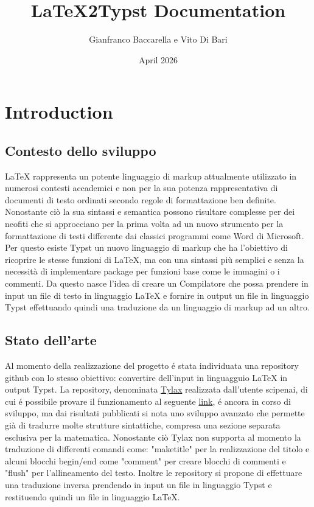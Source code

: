 ﻿\documentclass{article}
\title{LaTeX2Typst Documentation}
\author{Gianfranco Baccarella e Vito Di Bari}
\date{April 2026}
\begin{document}
    \maketitle
    \tableofcontents

    \section{Introduction}

    \subsection{Contesto dello sviluppo}
    LaTeX rappresenta un potente linguaggio di markup attualmente utilizzato in numerosi contesti accademici e non per la sua potenza rappresentativa di documenti di testo ordinati secondo regole di formattazione ben definite. Nonostante ciò la sua sintassi e semantica possono risultare complesse per dei neofiti che si approcciano per la prima volta ad un nuovo strumento per la formattazione di testi differente dai classici programmi come Word di Microsoft. Per questo esiste Typst un nuovo linguaggio di markup che ha l'obiettivo di ricoprire le stesse funzioni di LaTeX, ma con una sintassi più semplici e senza la necessità di implementare package per funzioni base come le immagini o i commenti.
    Da questo nasce l'idea di creare un Compilatore che possa prendere in input un file di testo in linguaggio LaTeX e fornire in output un file in linguaggio Typst effettuando quindi una traduzione da un linguaggio di markup ad un altro.

    \subsection{Stato dell'arte}
    Al momento della realizzazione del progetto é stata individuata una repository github con lo stesso obiettivo: convertire dell'input in linguagguio LaTeX in output Typst. La repository, denominata \href{https://github.com/scipenai/tylax}{Tylax} realizzata dall'utente scipenai, di cui é possibile provare il funzionamento al seguente \href{https://convert.silkyai.cn}{link}, é ancora in corso di sviluppo, ma dai risultati pubblicati si nota uno sviluppo avanzato che permette già di tradurre molte strutture sintattiche, compresa una sezione separata esclusiva per la matematica. Nonostante ciò Tylax non supporta al momento la traduzione di differenti comandi come: "maketitle" per la realizzazione del titolo e  alcuni blocchi begin/end come "comment" per creare blocchi di commenti e "flush" per l'allineamento del testo. Inoltre le repository si propone di effettuare una traduzione inversa prendendo in input un file in linguaggio Typst e restituendo quindi un file in linguaggio LaTeX.
\end{document}
